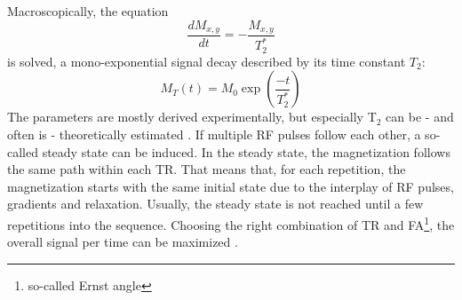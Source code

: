         Macroscopically, the equation
        \begin{equation}
        \frac{dM_{x,y}}{dt} = - \frac{M_{x,y}}{T_2^*}
        \end{equation}
        is solved, a mono-exponential signal decay described by its time constant $T_2$:
        \begin{equation}
            M_T(t) = M_0\exp{\left(\frac{-t}{T_2^*}\right)}
        \end{equation}
        The parameters are mostly derived experimentally, but especially T$_2$ can be - and often is - theoretically estimated \cite{kaupp_calculation_2003}.
        If multiple RF pulses follow each other, a so-called steady state can be induced.
        In the steady state, the magnetization follows the same path within each TR. That means that, for each repetition, the magnetization starts with the same initial state due to the interplay of RF pulses, gradients and relaxation. Usually, the steady state is not reached until a few repetitions into the sequence. Choosing the right combination of TR and FA\footnote[1]{so-called Ernst angle}, the overall signal per time can be maximized \cite{nitz_contrast_1999}.
